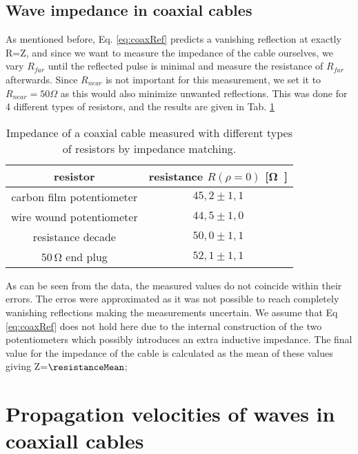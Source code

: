 \documentclass[a4paper,10pt,twocolumn]{article}
\begin{document}
    \subsection{Wave impedance in coaxial cables}
    As mentioned before, Eq. \ref{eq:coaxRef} predicts a vanishing reflection at exactly R=Z, and since we want to measure the impedance of the cable ourselves, we vary $R_{far}$ until the reflected pulse is minimal and measure the resistance of $R_{far}$ afterwards.
    Since $R_{near}$ is not important for this measurement, we set it to $R_{near}=50\Omega $ as this would also minimize unwanted reflections.
    This was done for 4 different types of resistors, and the results are given in Tab. \ref{tab:impedance}
    \begin{table}[htbp]          %
        \centering
        \begin{tabular*}{\linewidth}{@{\extracolsep{\fill}}cc}
            \hline
            \hline
            \rule[-7pt]{0pt}{23pt}  resistor  &  resistance $R(\rho=0)$ [\si\ohm]  	 \\
            \hline
            \rule[-5pt]{0pt}{23pt}   carbon film potentiometer   &   $45,2 \pm 1,1$  	 \\
            \rule[-5pt]{0pt}{23pt}   wire wound potentiometer   &   $44,5 \pm 1,0$  	 \\
            \rule[-5pt]{0pt}{23pt}   resistance decade   &   $50,0 \pm 1,1$  	 \\
            \rule[-5pt]{0pt}{23pt}   $50\,\si\ohm$ end plug   &   $52,1 \pm 1,1$  	 \\
            \hline
            \hline
        \end{tabular*}
        \normalsize
        \caption[]{Impedance of a coaxial cable measured with different types of resistors by impedance matching.}  %
        \label{tab:impedance}                             %
    \end{table}
    As can be seen from the data, the measured values do not coincide within their errors. The erros were approximated as it was not possible to reach completely wanishing reflections making the measurements uncertain.
    We assume that Eq \ref{eq:coaxRef} does not hold here due to the internal construction of the two potentiometers which possibly introduces an extra inductive impedance.
    The final value for the impedance of the cable is calculated as the mean of these values giving Z=$\resistanceMean$;
    \section{Propagation velocities of waves in coaxiall cables}
\end{document}
